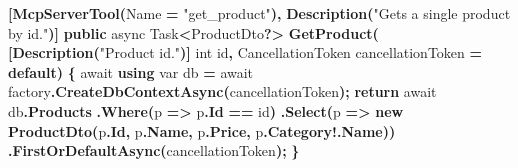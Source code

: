 \documentclass[
  italian,
  10pt,
]{book}
\newenvironment{Shaded}{\begin{snugshade}}{\end{snugshade}}
\newcommand{\DataTypeTok}[1]{\textcolor[rgb]{0.13,0.29,0.53}{#1}}
\newcommand{\FunctionTok}[1]{\textcolor[rgb]{0.13,0.29,0.53}{\textbf{#1}}}
\newcommand{\KeywordTok}[1]{\textcolor[rgb]{0.13,0.29,0.53}{\textbf{#1}}}
\newcommand{\NormalTok}[1]{#1}
\newcommand{\OperatorTok}[1]{\textcolor[rgb]{0.81,0.36,0.00}{\textbf{#1}}}
\newcommand{\StringTok}[1]{\textcolor[rgb]{0.31,0.60,0.02}{#1}}
\begin{document}
\begin{Shaded}
\begin{Highlighting}[]
    \OperatorTok{[}\FunctionTok{McpServerTool}\OperatorTok{(}\NormalTok{Name }\OperatorTok{=} \StringTok{"get\_product"}\OperatorTok{),} \FunctionTok{Description}\OperatorTok{(}\StringTok{"Gets a single product by id."}\OperatorTok{)]}
    \KeywordTok{public}\NormalTok{ async Task}\OperatorTok{\textless{}}\NormalTok{ProductDto}\OperatorTok{?\textgreater{}} \FunctionTok{GetProduct}\OperatorTok{(}
        \OperatorTok{[}\FunctionTok{Description}\OperatorTok{(}\StringTok{"Product id."}\OperatorTok{)]} \DataTypeTok{int}\NormalTok{ id}\OperatorTok{,}
\NormalTok{        CancellationToken cancellationToken }\OperatorTok{=} \KeywordTok{default}\OperatorTok{)}
    \OperatorTok{\{}
\NormalTok{        await }\KeywordTok{using} \DataTypeTok{var}\NormalTok{ db }\OperatorTok{=}\NormalTok{ await factory}\OperatorTok{.}\FunctionTok{CreateDbContextAsync}\OperatorTok{(}\NormalTok{cancellationToken}\OperatorTok{);}
        \KeywordTok{return}\NormalTok{ await db}\OperatorTok{.}\FunctionTok{Products}
            \OperatorTok{.}\FunctionTok{Where}\OperatorTok{(}\NormalTok{p }\OperatorTok{=\textgreater{}}\NormalTok{ p}\OperatorTok{.}\FunctionTok{Id} \OperatorTok{==}\NormalTok{ id}\OperatorTok{)}
            \OperatorTok{.}\FunctionTok{Select}\OperatorTok{(}\NormalTok{p }\OperatorTok{=\textgreater{}} \KeywordTok{new} \FunctionTok{ProductDto}\OperatorTok{(}\NormalTok{p}\OperatorTok{.}\FunctionTok{Id}\OperatorTok{,}\NormalTok{ p}\OperatorTok{.}\FunctionTok{Name}\OperatorTok{,}\NormalTok{ p}\OperatorTok{.}\FunctionTok{Price}\OperatorTok{,}\NormalTok{ p}\OperatorTok{.}\FunctionTok{Category}\OperatorTok{!.}\FunctionTok{Name}\OperatorTok{))}
            \OperatorTok{.}\FunctionTok{FirstOrDefaultAsync}\OperatorTok{(}\NormalTok{cancellationToken}\OperatorTok{);}
    \OperatorTok{\}}


\end{Highlighting}
\end{Shaded}
\end{document}
